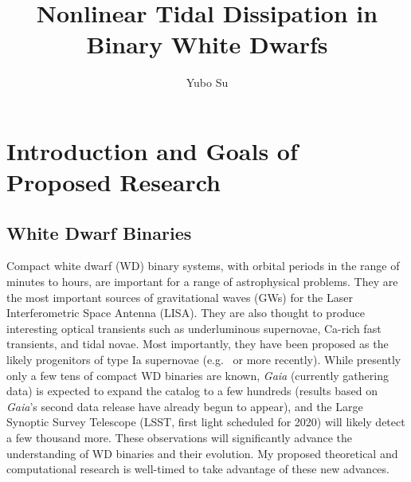 \documentclass[12pt,
        usenames, %
        dvipsnames %
    ]{article}
\begin{document}
\renewcommand*{\sectionautorefname}{Section}

\singlespacing

\pagestyle{fancy}
\rhead{}
\cfoot{\thepage/\pageref{LastPage}}

\title{Nonlinear Tidal Dissipation in Binary White Dwarfs}
\author{Yubo Su}
\date{}

\maketitle

\section{Introduction and Goals of Proposed Research}\label{s:1}

\subsection{White Dwarf Binaries}

Compact white dwarf (WD) binary systems, with orbital periods in the range of
minutes to hours, are important for a range of astrophysical problems. They are
the most important sources of gravitational waves (GWs) for the Laser
Interferometric Space Antenna (LISA)\cite{lisa}. They are also thought to
produce interesting optical transients such as underluminous
supernovae\cite{underlum}, Ca-rich fast transients\cite{carich}, and tidal
novae\cite{tidal_novae}. Most importantly, they have been proposed as the likely
progenitors of type Ia supernovae (e.g.~\cite{Ia0,webbink} or more
recently\cite{Ia1,Ia2}). While presently only a few tens of compact WD binaries
are known\cite{lsst_wd}, \emph{Gaia} (currently gathering data) is expected to
expand the catalog to a few hundreds\cite{lsst_wd} (results based on
\emph{Gaia}'s second data release have already begun to
appear\cite{gaiaDD,gaiaDD2}), and the Large Synoptic Survey Telescope (LSST,
first light scheduled for 2020) will likely detect a few thousand
more\cite{lsst_wd}. These observations will significantly advance the
understanding of WD binaries and their evolution. My proposed theoretical and
computational research is well-timed to take advantage of these new advances.
\end{document}
